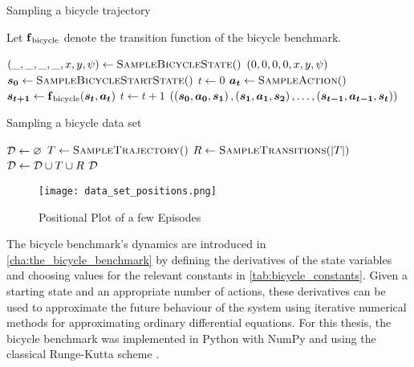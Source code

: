 \begin{algorithm}[p]
    \caption{Sampling a bicycle trajectory}
    \label{alg:bicycle_trajectories}
    Let $\DynBicycle$ denote the transition function of the bicycle benchmark.
    \begin{algorithmic}[1]
            \State $\Bicycle*{\_, \_, \_, \_, x, y, \psi} \gets \Call{SampleBicycleState}$
            \State \Return $\Bicycle*{0, 0, 0, 0, x, y, \psi}$
        \EndFunction
        \Statex
            \State $\mat{s_0} \gets \Call{SampleBicycleStartState}$
            \State $t \gets 0$
                \State $\mat{a_t} \gets \Call{SampleAction}$
                \State $\mat{s_{t+1}} \gets \DynBicycle(\mat{s_t}, \mat{a_t})$
                \State $t \gets t + 1$
            \EndWhile
            \State \Return $\left( \left( \mat{s_0}, \mat{a_0}, \mat{s_1} \right), \left( \mat{s_1}, \mat{a_1}, \mat{s_2} \right), \dots, \left( \mat{s_{t-1}}, \mat{a_{t-1}}, \mat{s_t} \right) \right)$
        \EndFunction
    \end{algorithmic}
\end{algorithm}
\begin{algorithm}[p]
    \caption{Sampling a bicycle data set}
    \label{alg:bicycle_data_set}
    \begin{algorithmic}[1]
            \State $\D \gets \emptyset$
                \State $T \gets \Call{SampleTrajectory}$
                \State $R \gets \Call{SampleTransitions}{\abs{T}}$
                \State $\D \gets \D \cup T \cup R$
            \EndWhile
            \State \Return $\D$
        \EndFunction
    \end{algorithmic}
\end{algorithm}
\begin{figure}[p]
    \centering
    \texttt{[image: data\_set\_positions.png]}
    \caption{Positional Plot of a few Episodes}
    \label{fig:data_set_plot}
\end{figure}
The bicycle benchmark's dynamics are introduced in \cref{cha:the_bicycle_benchmark} by defining the derivatives of the state variables and choosing values for the relevant constants in \cref{tab:bicycle_constants}.
Given a starting state and an appropriate number of actions, these derivatives can be used to approximate the future behaviour of the system using iterative numerical methods for approximating ordinary differential equations.
For this thesis, the bicycle benchmark was implemented in Python \cite{van_rossum_python_1995} with NumPy \cite{walt_numpy_2011} and using the classical Runge-Kutta scheme \cite{kutta_beitrag_1901}.

